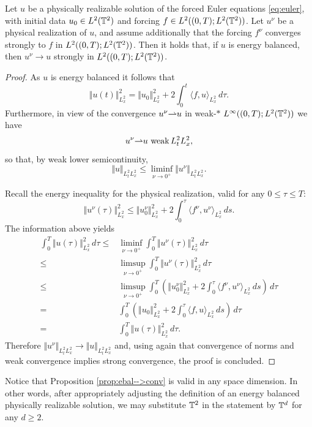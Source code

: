 \documentclass[reqno,12pt]{amsart}
\newcommand{\rem}[1]{{\color{red} #1}}
\begin{document}
\begin{proposition}
  \label{prop:ebal-->conv}
  Let $u$ be a physically realizable solution of the forced Euler equations \eqref{eq:euler}, with initial data $u_0 \in L^2(\mathbb{T}^2)$ and forcing $f\in L^2 ((0,T);L^2 (\mathbb{T}^2))$. Let $u^\nu$ be a physical realization of $u$, and assume additionally that the forcing $f^\nu$ converges strongly to $f$ in $L^2 ((0,T);L^2 (\mathbb{T}^2))$. Then it holds that, if $u$ is energy balanced, then $u^\nu \to u$ strongly in $L^2 ((0,T);L^2 (\mathbb{T}^2))$.
\end{proposition}

\begin{proof}
  As $u$ is energy balanced it follows that
  \[
  \Vert u(t) \Vert_{L^2_x}^2 =   \Vert u_0 \Vert_{L^2_x}^2 + 2 \int_0^t \langle f, u \rangle_{L^2_x} \, d\tau.
  \]
  Furthermore, in view of the convergence $u^\nu {\rightharpoonup} u$  in weak-$\ast$ $L^\infty((0,T);L^2(\mathbb{T}^2))$ we have
  \[u^\nu {\rightharpoonup} u \text{ weak} \, L^2_tL^2_x,\]
  so that, by weak lower semicontinuity,
  \[
  \Vert u \Vert_{L^2_tL^2_x} \le \liminf_{\nu \to 0^+} \Vert u^\nu \Vert_{L^2_tL^2_x}.
  \]

  Recall the energy inequality for the physical realization, valid for any $0 \le \tau \le T$:
\[
  \Vert u^\nu(\tau) \Vert_{L^2_x}^2 \leq   \Vert u_0^\nu \Vert_{L^2_x}^2 + 2 \int_0^\tau \langle f^\nu, u^\nu \rangle_{L^2_x} \, ds.
  \]
 The information above yields
\begin{align}\label{enbalstrngconv}
  \int_0^T \Vert u(\tau) \Vert_{L^2_x}^2 \,d\tau  \le & \liminf_{\nu \to 0^+} \int_0^T \Vert u^\nu (\tau) \Vert_{L^2_x}^2 \,d\tau \\
  \le & \limsup_{\nu \to 0^+} \int_0^T \Vert u^\nu (\tau) \Vert_{L^2_x}^2 \,d\tau  \\
  \le & \limsup_{\nu \to 0^+} \int_0^T \left(\Vert u_0^\nu \Vert_{L^2_x}^2 + 2 \int_0^\tau \langle f^\nu, u^\nu \rangle_{L^2_x} \, ds \right) \, d\tau  \\
   = & \int_0^T \left( \Vert u_0 \Vert_{L^2_x}^2 + 2 \int_0^\tau \langle f , u \rangle_{L^2_x} \, ds \right) \, d\tau\\
   = & \int_0^T \Vert u(\tau) \Vert_{L^2_x}^2 \,d\tau .
\end{align}
Therefore $\Vert u^\nu \Vert_{L^2_tL^2_x} \to \Vert u  \Vert_{L^2_tL^2_x}$ and, using again that convergence of norms and weak convergence implies strong convergence, the proof is concluded.
\end{proof}

\begin{remark} \label{rem:anydimension}
Notice that Proposition \ref{prop:ebal-->conv} is valid in any space dimension. In other words, after appropriately adjusting the definition of an energy balanced physically realizable solution, we may substitute $\mathbb{T}^2$ in the statement by $\mathbb{T}^d$ for any $d \geq 2$.
\end{remark}
\end{document}
